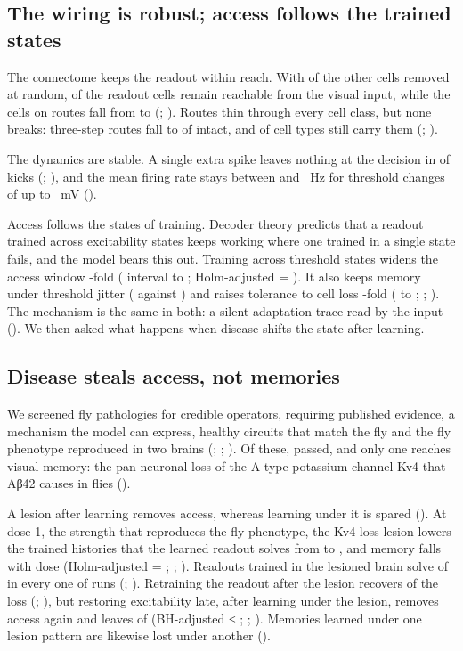 \subsection{The wiring is robust; access follows the trained states}

The connectome keeps the readout within reach. With  of the other cells removed at random,  of the readout
cells remain reachable from the visual input, while the cells on routes fall from  to  (;
). Routes thin through every cell class, but none breaks: three-step routes fall to  of intact, and
 of  cell types still carry them (; ).

The dynamics are stable. A single extra spike leaves nothing at the decision in  of  kicks (;
), and the mean firing rate stays between  and ~Hz for threshold changes of up to ~mV
().

Access follows the states of training. Decoder theory predicts that a readout trained across excitability states keeps working
where one trained in a single state fails, and the model bears this out. Training across threshold states
widens the access window -fold ( interval  to ; Holm-adjusted \Pv{} = ). It also
keeps memory under threshold jitter ( against ) and raises tolerance to cell loss -fold (
to ; ; ). The mechanism is the same in both: a silent adaptation trace read by the input
(). We then asked what happens when disease shifts the state after learning.

\subsection{Disease steals access, not memories}

We screened  fly pathologies for credible operators, requiring published evidence, a mechanism the model can express,
healthy circuits that match the fly and the fly phenotype reproduced in two brains (; ; ). Of these,
 passed, and only one reaches visual memory: the pan-neuronal loss of the A-type potassium channel Kv4 that Aβ42 causes
in flies ().

A lesion after learning removes access, whereas learning under it is spared (). At dose 1, the strength that reproduces the
fly phenotype, the Kv4-loss lesion lowers the trained histories that the learned readout solves from  to ,
and memory falls with dose (Holm-adjusted \Pv{} = ; ; ). Readouts trained in the lesioned brain solve  of  in every one of
 runs (; ). Retraining the readout after the lesion recovers  of the loss (;
), but restoring excitability late, after learning under the lesion, removes access again and leaves  of
 (BH-adjusted \Pv{} ≤ ; ; ). Memories learned under one lesion pattern are likewise lost
under another ().

